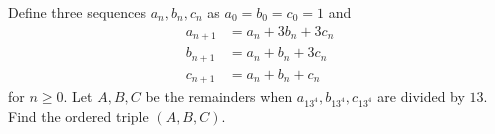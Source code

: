 Define three sequences $a_n,b_n,c_n$ as $a_0=b_0=c_0=1$ and
\begin{align*}
    a_{n+1}&=a_n+3b_n+3c_n \\
    b_{n+1}&=a_n+b_n+3c_n \\
    c_{n+1}&=a_n+b_n+c_n
\end{align*}
for $n\geq0$. Let $A,B,C$ be the remainders when $a_{13^4},b_{13^4},c_{13^4}$ are divided by $13$. Find the ordered triple $(A,B,C)$.